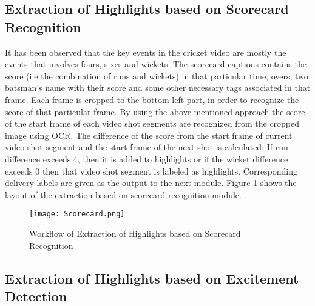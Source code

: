 \subsection{Extraction of Highlights based on Scorecard Recognition}
It has been observed that the key events in the cricket video are mostly the events that involves fours, sixes and wickets. The scorecard captions contains the score (i.e the combination of runs and wickets) in that particular time, overs, two batsman's name with their score and some other necessary tags associated in that frame. Each frame is cropped to the bottom left part, in order to recognize the score of that particular frame. By using the above mentioned approach the score of the start frame of each video shot segments are recognized from the cropped image using OCR. The difference of the score from the start frame of current video shot segment and the start frame of the next shot is calculated. If run difference exceeds 4, then it is added to highlights or if the wicket difference exceeds 0 then that video shot segment is labeled as highlights. Corresponding delivery labels are given as the output to the next module. Figure \ref{fig:Scorecard} shows the layout of the extraction based on scorecard recognition module.

\begin{figure}[h]
    \centering
    \texttt{[image: Scorecard.png]}
    \caption{Workflow of Extraction of Highlights based on Scorecard Recognition}
    \label{fig:Scorecard}
\end{figure}

\newpage
\subsection{Extraction of Highlights based on Excitement Detection}

